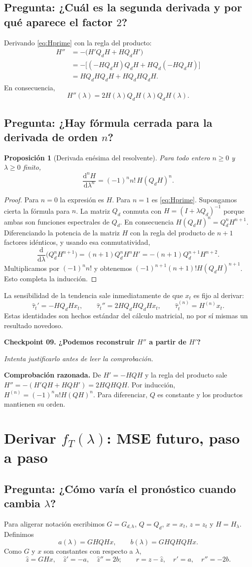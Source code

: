 \documentclass[11pt,letterpaper,parskip=half,headings=small]{scrartcl}
\newtheorem{proposicion}{Proposición}[section]
\theoremstyle{definition}\newtheorem{definicion}[proposicion]{Definición}
\theoremstyle{remark}\newtheorem{observacion}[proposicion]{Observación}
\newcommand{\dt}{\mathrm d}\newcommand{\Q}{Q_d}
\newcommand{\pregunta}[1]{\subsection{Pregunta: #1}}
\newcommand{\checkpoint}[3]{%
  \par\medskip\noindent\textbf{\color{blue!45!black}Checkpoint #1. #2}\par
  \noindent\emph{Intenta justificarlo antes de leer la comprobación.}\par
  \noindent\textbf{Comprobación razonada. }#3\par\bigskip
}
\begin{document}
\pregunta{¿Cuál es la segunda derivada y por qué aparece el factor $2$?}
Derivando \eqref{eq:Hprime} con la regla del producto:
\begin{align*}
H''&=-\bigl(H'Q_dH+HQ_dH'\bigr)\\
&=-\bigl[(-HQ_dH)Q_dH+HQ_d(-HQ_dH)\bigr]\\
&=HQ_dHQ_dH+HQ_dHQ_dH.
\end{align*}
En consecuencia,
\begin{equation}\label{eq:Hsecond}\boxed{H''(\lambda)=2H(\lambda)Q_dH(\lambda)Q_dH(\lambda).}\end{equation}

\pregunta{¿Hay fórmula cerrada para la derivada de orden $n$?}
\begin{proposicion}[Derivada enésima del resolvente]\label{prop:nth}
Para todo entero $n\geq0$ y $\lambda\geq0$ finito,
\begin{equation}\label{eq:nth}
\boxed{\frac{\dt^nH}{\dt\lambda^n}=(-1)^n n!\,H(Q_dH)^n.}
\end{equation}
\end{proposicion}
\begin{proof}
Para $n=0$ la expresión es $H$. Para $n=1$ es \eqref{eq:Hprime}. Supongamos cierta la fórmula para $n$. La matriz $Q_d$ conmuta con $H=(I+\lambda Q_d)^{-1}$ porque ambas son funciones espectrales de $Q_d$. En consecuencia $H(Q_dH)^n=Q_d^nH^{n+1}$. Diferenciando la potencia de la matriz $H$ con la regla del producto de $n+1$ factores idénticos, y usando esa conmutatividad,
\[
\frac{\dt}{\dt\lambda}\bigl(Q_d^nH^{n+1}\bigr)
=(n+1)Q_d^nH^nH'=-(n+1)Q_d^{n+1}H^{n+2}.
\]
Multiplicamos por $(-1)^nn!$ y obtenemos $(-1)^{n+1}(n+1)!H(Q_dH)^{n+1}$. Esto completa la inducción.
\end{proof}

La sensibilidad de la tendencia sale inmediatamente de que $x_t$ es fijo al derivar:
\begin{equation}\label{eq:trend-deriv}
\widehat\tau_t'=-HQ_dHx_t,\qquad
\widehat\tau_t''=2HQ_dHQ_dHx_t,\qquad
\widehat\tau_t^{(n)}=H^{(n)}x_t.
\end{equation}
Estas identidades son hechos estándar del cálculo matricial, no por sí mismas un resultado novedoso.

\checkpoint{09}{¿Podemos reconstruir $H''$ a partir de $H'$?}{De $H'=-HQH$ y la regla del producto sale $H''=-(H'QH+HQH')=2HQHQH$. Por inducción, $H^{(n)}=(-1)^nn!H(QH)^n$. Para diferenciar, $Q$ es constante y los productos mantienen su orden.}

\section{Derivar $f_T(\lambda)$: MSE futuro, paso a paso}
\pregunta{¿Cómo varía el pronóstico cuando cambia $\lambda$?}
Para aligerar notación escribimos $G=G_{d,h}$, $Q=Q_d$, $x=x_t$, $z=z_t$ y $H=H_\lambda$. Definimos
\[
a(\lambda)=GHQHx,\qquad b(\lambda)=GHQHQHx.
\]
Como $G$ y $x$ son constantes con respecto a $\lambda$,
\begin{equation}\label{eq:pred-deriv}
\widehat z=GHx,\quad \widehat z'=-a,\quad \widehat z''=2b;
\qquad r=z-\widehat z,\quad r'=a,\quad r''=-2b.
\end{equation}
\end{document}
